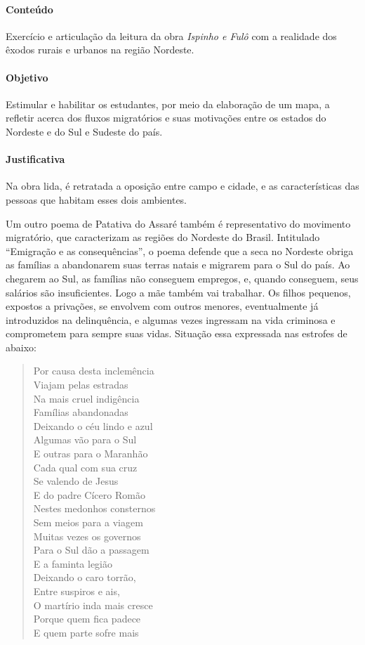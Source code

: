 \documentclass[12pt]{extarticle}
\begin{document}
\paragraph{Conteúdo} Exercício e articulação da leitura da obra 
\emph{Ispinho e Fulô} com a realidade dos êxodos rurais e urbanos na 
região Nordeste.

\paragraph{Objetivo} Estimular e habilitar os estudantes, por meio da 
elaboração de um mapa, a refletir acerca dos fluxos migratórios e suas 
motivações entre os estados do Nordeste e do Sul e Sudeste do país. 

\paragraph{Justificativa} Na obra lida, é retratada a oposição entre campo 
e cidade, e as características das pessoas que habitam esses dois ambientes.

Um outro poema de Patativa do Assaré também é representativo do movimento 
migratório, que caracterizam as regiões do Nordeste do Brasil. Intitulado 
``Emigração e as consequências'', o poema defende que a seca no Nordeste 
obriga as famílias a abandonarem suas terras natais e migrarem para o 
Sul do país. Ao chegarem ao Sul, as famílias não conseguem empregos, e, 
quando conseguem, seus salários são insuficientes. Logo a mãe também vai 
trabalhar. Os filhos pequenos, expostos a privações, se envolvem com 
outros menores, eventualmente já introduzidos na delinquência, e algumas 
vezes ingressam na vida criminosa e comprometem para sempre suas vidas. 
Situação essa expressada nas estrofes de abaixo:

\begin{verse}
Por causa desta inclemência\\
Viajam pelas estradas\\
Na mais cruel indigência\\
Famílias abandonadas\\
Deixando o céu lindo e azul\\
Algumas vão para o Sul\\
E outras para o Maranhão\\
Cada qual com sua cruz\\
Se valendo de Jesus\\
E do padre Cícero Romão\\

Nestes medonhos consternos\\
Sem meios para a viagem\\
Muitas vezes os governos\\
Para o Sul dão a passagem\\
E a faminta legião\\
Deixando o caro torrão,\\
Entre suspiros e ais,\\
O martírio inda mais cresce\\
Porque quem fica padece\\
E quem parte sofre mais\\
\end{verse}
\end{document}
